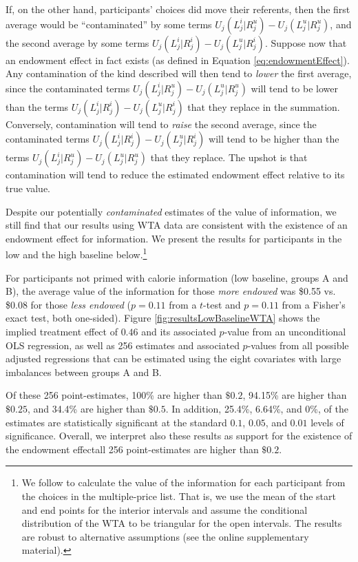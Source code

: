 If, on the other hand, participants' choices did move their referents, then the first average would be \enquote{contaminated} by some terms $U_j(L_j^i|R_j^u)-U_j(L_j^u|R_j^u)$, and the second average by some terms $U_j(L_j^i|R_j^i)-U_j(L_j^u|R_j^i)$. Suppose now that an endowment effect in fact exists (as defined in Equation \ref{eq:endowmentEffect}). Any contamination of the kind described will then tend to \emph{lower} the first average, since the contaminated terms $U_j(L_j^i|R_j^u)-U_j(L_j^u|R_j^u)$ will tend to be lower than the terms $U_j(L_j^i|R_j^i)-U_j(L_j^u|R_j^i)$ that they replace in the summation. Conversely, contamination will tend to \emph{raise} the second average, since the contaminated terms $U_j(L_j^i|R_j^i)-U_j(L_j^u|R_j^i)$ will tend to be higher than the terms $U_j(L_j^i|R_j^u)-U_j(L_j^u|R_j^u)$ that they replace. The upshot is that contamination will tend to reduce the estimated endowment effect relative to its true value.

Despite our potentially \emph{contaminated} estimates of the value of information, we still find that our results using WTA data are consistent with the existence of an endowment effect for information. We present the results for participants in the low and the high baseline below.\footnote{We follow \citet{allcottWelfareEffectsNudges2019} to calculate the value of the information for each participant from the choices in the multiple-price list. That is, we use the mean of the start and end points for the interior intervals and assume the conditional distribution of the WTA to be triangular for the open intervals. The results are robust to alternative assumptions (see the online supplementary material).}

For participants not primed with calorie information (low baseline, groups A and B), the average value of the information for those \emph{more endowed} was \$0.55 vs. \$0.08 for those \emph{less endowed} ($p=0.11$ from a $t$-test and $p=0.11$ from a Fisher's exact test, both one-sided). Figure \ref{fig:resultsLowBaselineWTA} shows the implied treatment effect of $0.46$ and its associated $p$-value from an unconditional OLS regression, as well as 256 estimates and associated $p$-values from all possible adjusted regressions that can be estimated using the eight covariates with large imbalances between groups A and B.

Of these 256 point-estimates, 100\% are higher than $\$0.2$, 94.15\% are higher than $\$0.25$, and 34.4\% are higher than $\$0.5$. In addition, 25.4\%, 6.64\%, and 0\%, of the estimates are statistically significant at the standard $0.1$, $0.05$, and $0.01$ levels of significance. Overall, we interpret also these results as support for the existence of the endowment effect\textemdash all 256 point-estimates are higher than $\$0.2$.

